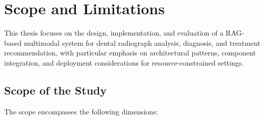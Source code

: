 \documentclass[12pt,a4paper]{report}
\begin{document}
	\section{Scope and Limitations}
	This thesis focuses on the design, implementation, and evaluation of a RAG-based multimodal system for dental radiograph analysis, diagnosis, and treatment recommendation, with particular emphasis on architectural patterns, component integration, and deployment considerations for resource-constrained settings.
	
	\subsection{Scope of the Study}
	
	The scope encompasses the following dimensions:
	
\end{document}
